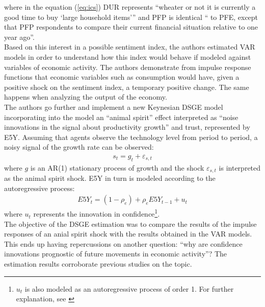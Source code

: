 where in the equation (\ref{eq:ics}) DUR represents ``wheater or not it is currently a good time to buy `large household items''' \cite[p.1372]{barsky2012information} and PFP is identical `` to PFE, except that PFP respondents to compare their current financial situation relative to one year ago''\cite[p.1372]{barsky2012information}.\\

Based on this interest in a possible sentiment index, the authors estimated VAR models in order to understand how this index would behave if modeled against variables of economic activity. The authors demonstrate from impulse response functions that economic variables such as consumption would have, given a positive shock on the sentiment index, a temporary positive change. The same happens when analyzing the output of the economy.\\

The authors go further and implement a new Keynesian DSGE model incorporating into the model an ``animal spirit'' effect interpreted as ``noise innovations in the signal about productivity growth''\cite[p.1353]{barsky2012information} and trust, represented by E5Y. Assuming that agents observe the technology level from period to period, a noisy signal of the growth rate can be observed:
\begin{align*}
     s_t = g_t + \varepsilon_{s,t}
\end{align*}
where $g$ is an AR(1) stationary process of growth and the shock $\varepsilon_{s,t}$ is interpreted as the animal spirit shock. E5Y in turn is modeled according to the autoregressive process:
\begin{align*}
     E5Y_t = (1 - \rho_e) + \rho_e E5Y_{t-1} + u_t
\end{align*}
where $u_t$ represents the innovation in confidence\footnote{$u_t$ is also modeled as an autoregressive process of order 1. For further explanation, see \cite[p.1354]{barsky2012information}}.\\

The objective of the DSGE estimation was to compare the results of the impulse responses of an anial spirit shock with the results obtained in the VAR models. This ends up having repercussions on another question: ``why are confidence innovations prognostic of future movements in economic activity''\cite[1356]{barsky2012information}? The estimation results corroborate previous studies \cite{rotemberg1997optimization, christiano2005nominal} on the topic.\\

